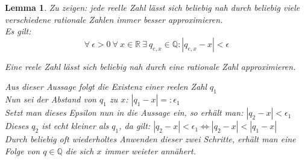 \documentclass{article}
\begin{document}
    \newtheorem{lemma4}[lemma_counter]{Lemma}
    \begin{lemma4}
        Zu zeigen: jede reelle Zahl lässt sich beliebig nah durch beliebig viele verschiedene rationale Zahlen immer besser approximieren. \\
        Es gilt: 
        \[\forall \: \epsilon > 0 \: \forall \: x \in \mathbb{R} \: \exists \: q_{e,x} \in \mathbb{Q}: |q_{e,x} - x| < \epsilon \]
        \begin{center}
            Eine reele Zahl lässt sich beliebig nah durch eine rationale Zahl approximieren.
        \end{center}
        Aus dieser Aussage folgt die Existenz einer reelen Zahl \(q_1\) \\
        Nun sei der Abstand von \(q_1\) zu \(x\): \( |q_1 - x| =: \epsilon_1 \) \\
        Setzt man dieses Epsilon nun in die Aussage ein, so erhält man: \( |q_2 - x| < \epsilon_1 \) \\
        Dieses \(q_2\) ist echt kleiner als \(q_1\), da gilt:
        \( |q_2 - x| < \epsilon_1 \Leftrightarrow |q_2 - x| < |q_1 - x| \) \\
        Durch beliebig oft wiederholtes Anwenden dieser zwei Schritte, erhält man eine Folge von \(q \in \mathbb{Q} \) die sich \(x\) immer weieter annähert. 
    \end{lemma4}
\end{document}
